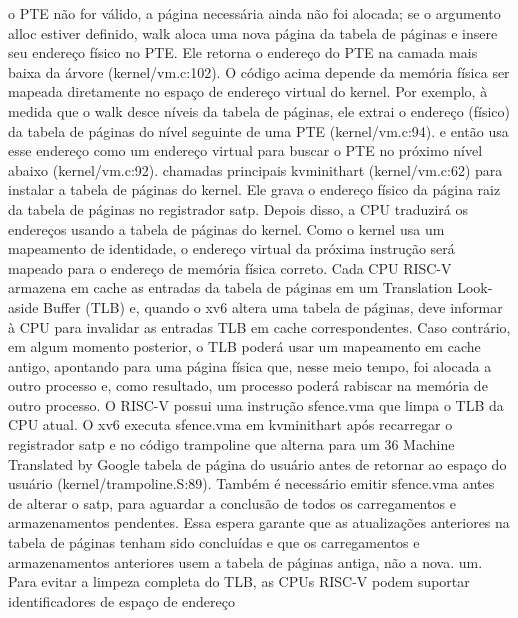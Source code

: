 o  PTE  não  for  válido,  a  página  necessária  ainda  não  foi  alocada;  se  o  argumento  alloc  estiver  definido,  walk  aloca  uma  
nova  página  da  tabela  de  páginas  e  insere  seu  endereço  físico  no  PTE.  Ele  retorna  o  endereço  do  PTE  na  camada  mais  
baixa  da  árvore  (kernel/vm.c:102).
 O  código  acima  depende  da  memória  física  ser  mapeada  diretamente  no  espaço  de  endereço  virtual  do  kernel.  Por  
exemplo,  à  medida  que  o  walk  desce  níveis  da  tabela  de  páginas,  ele  extrai  o  endereço  (físico)  da  tabela  de  páginas  do  
nível  seguinte  de  uma  PTE  (kernel/vm.c:94).  e  então  usa  esse  endereço  como  um  endereço  virtual  para  buscar  o  PTE  
no  próximo  nível  abaixo  (kernel/vm.c:92).
 chamadas  principais  kvminithart  (kernel/vm.c:62)  para  instalar  a  tabela  de  páginas  do  kernel.  Ele  grava  o  
endereço  físico  da  página  raiz  da  tabela  de  páginas  no  registrador  satp.  Depois  disso,  a  CPU  traduzirá  os  
endereços  usando  a  tabela  de  páginas  do  kernel.  Como  o  kernel  usa  um  mapeamento  de  identidade,  o  endereço  
virtual  da  próxima  instrução  será  mapeado  para  o  endereço  de  memória  física  correto.
 Cada  CPU  RISC-V  armazena  em  cache  as  entradas  da  tabela  de  páginas  em  um  Translation  Look-aside  Buffer  
(TLB)  e,  quando  o  xv6  altera  uma  tabela  de  páginas,  deve  informar  à  CPU  para  invalidar  as  entradas  TLB  em  cache  
correspondentes.  Caso  contrário,  em  algum  momento  posterior,  o  TLB  poderá  usar  um  mapeamento  em  cache  antigo,  
apontando  para  uma  página  física  que,  nesse  meio  tempo,  foi  alocada  a  outro  processo  e,  como  resultado,  um  processo  
poderá  rabiscar  na  memória  de  outro  processo.  O  RISC-V  possui  uma  instrução  sfence.vma  que  limpa  o  TLB  da  CPU  
atual.  O  xv6  executa  sfence.vma  em  kvminithart  após  recarregar  o  registrador  satp  e  no  código  trampoline  que  alterna  
para  um
 36
Machine Translated by Google
 tabela  de  página  do  usuário  antes  de  retornar  ao  espaço  do  usuário  (kernel/trampoline.S:89).
 Também  é  necessário  emitir  sfence.vma  antes  de  alterar  o  satp,  para  aguardar  a  conclusão  de  todos  os  carregamentos  e  
armazenamentos  pendentes.  Essa  espera  garante  que  as  atualizações  anteriores  na  tabela  de  páginas  tenham  sido  concluídas  e  
que  os  carregamentos  e  armazenamentos  anteriores  usem  a  tabela  de  páginas  antiga,  não  a  nova.
 um.
 Para  evitar  a  limpeza  completa  do  TLB,  as  CPUs  RISC-V  podem  suportar  identificadores  de  espaço  de  endereço  
